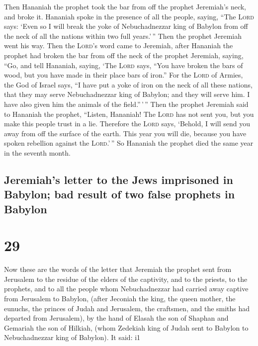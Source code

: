  Then Hananiah the prophet took the bar from off the
prophet Jeremiah's neck, and broke it.  Hananiah spoke in
the presence of all the people, saying, ``The \textsc{Lord} says: `Even
so I will break the yoke of Nebuchadnezzar king of Babylon from off the
neck of all the nations within two full years.'\,'' Then the prophet
Jeremiah went his way.  Then the \textsc{Lord}'s word
came to Jeremiah, after Hananiah the prophet had broken the bar from off
the neck of the prophet Jeremiah, saying,  ``Go, and tell
Hananiah, saying, `The \textsc{Lord} says, ``You have broken the bars of
wood, but you have made in their place bars of iron.'' 
For the \textsc{Lord} of Armies, the God of Israel says, ``I have put a
yoke of iron on the neck of all these nations, that they may serve
Nebuchadnezzar king of Babylon; and they will serve him. I have also
given him the animals of the field.''\,'\,''  Then the
prophet Jeremiah said to Hananiah the prophet, ``Listen, Hananiah! The
\textsc{Lord} has not sent you, but you make this people trust in a lie.
 Therefore the \textsc{Lord} says, `Behold, I will send
you away from off the surface of the earth. This year you will die,
because you have spoken rebellion against the \textsc{Lord}.'\,''
 So Hananiah the prophet died the same year in the
seventh month.

\hypertarget{jeremiahs-letter-to-the-jews-imprisoned-in-babylon-bad-result-of-two-false-prophets-in-babylon}{%
\subsection{Jeremiah's letter to the Jews imprisoned in Babylon; bad
result of two false prophets in
Babylon}\label{jeremiahs-letter-to-the-jews-imprisoned-in-babylon-bad-result-of-two-false-prophets-in-babylon}}

\hypertarget{section-28}{%
\section{29}\label{section-28}}

 Now these are the words of the letter that Jeremiah the
prophet sent from Jerusalem to the residue of the elders of the
captivity, and to the priests, to the prophets, and to all the people
whom Nebuchadnezzar had carried away captive from Jerusalem to Babylon,
 (after Jeconiah the king, the queen mother, the eunuchs,
the princes of Judah and Jerusalem, the craftsmen, and the smiths had
departed from Jerusalem),  by the hand of Elasah the son
of Shaphan and Gemariah the son of Hilkiah, (whom Zedekiah king of Judah
sent to Babylon to Nebuchadnezzar king of Babylon). It said: i1

